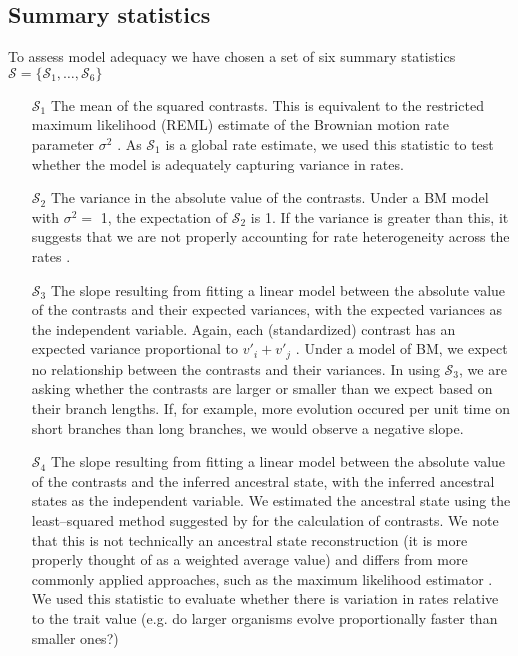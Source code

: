 \documentclass[a4paper,12pt]{article}
\begin{document}
\subsection*{Summary statistics}

To assess model adequacy we have chosen a set of six summary statistics $\mathcal{S} = \lbrace \mathcal{S}_1, \ldots, \mathcal{S}_6 \rbrace$

\begin{enumerate}
\item[$\mathcal{S}_1$] The mean of the squared contrasts. This is equivalent to the restricted maximum likelihood (REML) estimate of the Brownian motion rate parameter $\sigma^2$ \citep{Garland1992, Rohlf2001}. As $\mathcal{S}_1$ is a global rate estimate, we used this statistic to test whether the model is adequately capturing variance in rates.

\item[$\mathcal{S}_2$] The variance in the absolute value of the contrasts. Under a BM model with $\sigma^2 =$ 1, the expectation of $\mathcal{S}_2$ is 1. If the variance is greater than this, it suggests that we are not properly accounting for rate heterogeneity across the rates \citep[\textit{sensu}][]{Omeara2006, Eastman2011}.

\item[$\mathcal{S}_3$] The slope resulting from fitting a linear model between the absolute value of the contrasts and their expected variances, with the expected variances as the independent variable. Again, each (standardized) contrast has an expected variance proportional to $v\prime_i + v\prime_j$  \citep{Felsenstein1985}. Under a model of BM, we expect no relationship between the contrasts and their variances. In using $\mathcal{S}_3$, we are asking whether the contrasts are larger or smaller than we expect based on their branch lengths. If, for example, more evolution occured per unit time on short branches than long branches, we would observe a negative slope.

\item[$\mathcal{S}_4$] The slope resulting from fitting a linear model between the absolute value of the contrasts and the inferred ancestral state, with the inferred ancestral states as the independent variable. We estimated the ancestral state using the least--squared method suggested by \citep{Felsenstein1985} for the calculation of contrasts. We note that this is not technically an ancestral state reconstruction (it is more properly thought of as a weighted average value) and differs from more commonly applied approaches, such as the  maximum likelihood estimator \citep{Schluter1997}. We used this statistic to evaluate whether there is variation in rates relative to the trait value (e.g. do larger organisms evolve proportionally faster than smaller ones?)


\end{enumerate}
\end{document}
